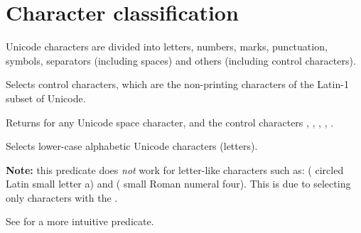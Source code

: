 \section{Character classification}
Unicode characters are divided into letters, numbers, marks,
 punctuation, symbols, separators (including spaces) and others (including
 control characters).\par
\begin{haddockdesc}
\item[\begin{tabular}{@{}l}
isControl :: Char -> Bool
\end{tabular}]
{\haddockbegindoc
Selects control characters, which are the non-printing characters of
 the Latin-1 subset of Unicode.\par}
\end{haddockdesc}
\begin{haddockdesc}
\item[\begin{tabular}{@{}l}
isSpace :: Char -> Bool
\end{tabular}]
{\haddockbegindoc
Returns  for any Unicode space character, and the control
 characters , , , , .\par}
\end{haddockdesc}
\begin{haddockdesc}
\item[\begin{tabular}{@{}l}
isLower :: Char -> Bool
\end{tabular}]
{\haddockbegindoc
Selects lower-case alphabetic Unicode characters (letters).\par
\textbf{Note:} this predicate does \emph{not} work for letter-like characters such as:
  ( circled Latin small letter a) and
  ( small Roman numeral four). This is due to selecting only
 characters with the  .\par
See  for a more intuitive predicate.\par}
\end{haddockdesc}
